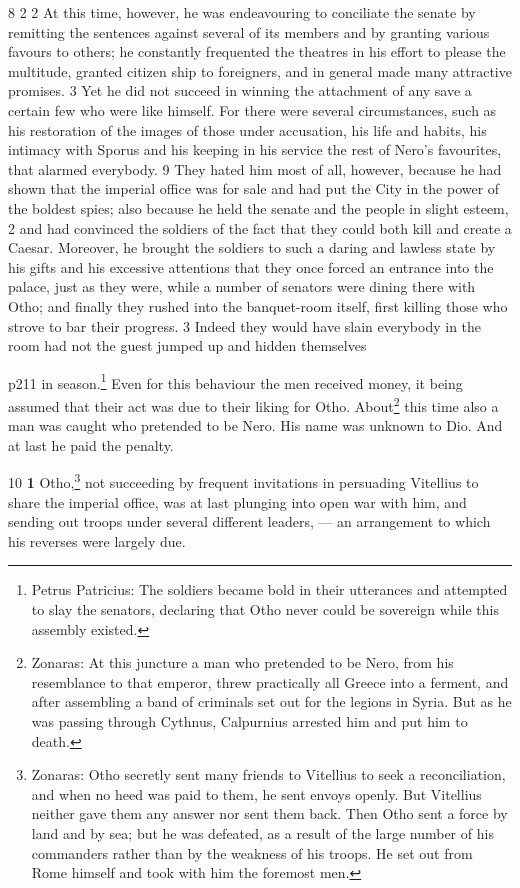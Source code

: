 8 2 2 At this time, however, he was endeavouring to conciliate the senate by remitting the sentences against several of its members and by granting various favours to others; he constantly frequented the theatres in his effort to please the multitude, granted citizen ­ship to foreigners, and in general made many attractive promises. 3 Yet he did not succeed in winning the attachment of any save a certain few who were like himself. For there were several circumstances, such as his restoration of the images of those under accusation, his life and habits, his intimacy with Sporus and his keeping in his service the rest of Nero's favourites, that alarmed everybody. 9 They hated him most of all, however, because he had shown that the imperial office was for sale and had put the City in the power of the boldest spies; also because he held the senate and the people in slight esteem, 2 and had convinced the soldiers of the fact that they could both kill and create a Caesar. Moreover, he brought the soldiers to such a daring and lawless state by his gifts and his excessive attentions that they once forced an entrance into the palace, just as they were, while a number of senators were dining there with Otho; and finally they rushed into the banquet-room itself, first killing those who strove to bar their progress. 3 Indeed they would have slain everybody in the room had not the guest jumped up and hidden themselves

p211 in season.\texthebrew{⁠}\footnote{Petrus Patricius: The soldiers became bold in their utterances and attempted to slay the senators, declaring that Otho never could be sovereign while this assembly existed.

} Even for this behaviour the men received money, it being assumed that their act was due to their liking for Otho. About\texthebrew{⁠}\footnote{Zonaras: At this juncture a man who pretended to be Nero, from his resemblance to that emperor, threw practically all Greece into a ferment, and after assembling a band of criminals set out for the legions in Syria. But as he was passing through Cythnus, Calpurnius arrested him and put him to death.

} this time also a man was caught who pretended to be Nero. His name was unknown to Dio. And at last he paid the penalty.

10
\textbf{1} Otho,\texthebrew{⁠}\footnote{Zonaras: Otho secretly sent many friends to Vitellius to seek a reconciliation, and when no heed was paid to them, he sent envoys openly. But Vitellius neither gave them any answer nor sent them back. Then Otho sent a force by land and by sea; but he was defeated, as a result of the large number of his commanders rather than by the weakness of his troops. He set out from Rome himself and took with him the foremost men.

} not succeeding by frequent invitations in persuading Vitellius to share the imperial office, was at last plunging into open war with him, and sending out troops under several different leaders, \texthebrew{—} an arrangement to which his reverses were largely due.

